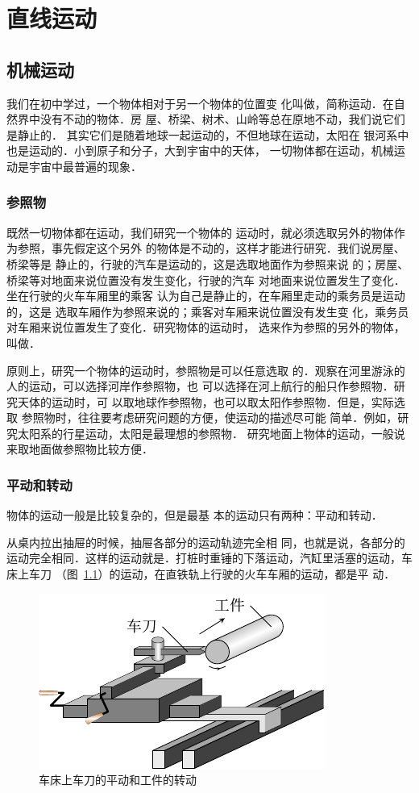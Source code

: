 \chapter{直线运动}\label{chapter-rectilinear-motion}

\section{机械运动}
 我们在初中学过，一个物体相对于另一个物体的位置变
化叫做，简称运动．在自然界中没有不动的物体．房
屋、桥梁、树术、山岭等总在原地不动，我们说它们是静止的．
其实它们是随着地球一起运动的，不但地球在运动，太阳在
银河系中也是运动的．小到原子和分子，大到宇宙中的天体，
一切物体都在运动，机械运动是宇宙中最普遍的现象．

\subsection{参照物} 

既然一切物体都在运动，我们研究一个物体的
运动时，就必须选取另外的物体作为参照，事先假定这个另外
的物体是不动的，这样才能进行研究．我们说房屋、桥梁等是
静止的，行驶的汽车是运动的，这是选取地面作为参照来说
的；房屋、桥梁等对地面来说位置没有发生变化，行驶的汽车
对地面来说位置发生了变化．坐在行驶的火车车厢里的乘客
认为自己是静止的，在车厢里走动的乘务员是运动的，这是
选取车厢作为参照来说的；乘客对车厢来说位置没有发生变
化，乘务员对车厢来说位置发生了变化．研究物体的运动时，
选来作为参照的另外的物体，叫做．

    原则上，研究一个物体的运动时，参照物是可以任意选取
的．观察在河里游泳的人的运动，可以选择河岸作参照物，也
可以选择在河上航行的船只作参照物．研究天体的运动时，可
以取地球作参照物，也可以取太阳作参照物．但是，实际选取
参照物时，往往要考虑研究问题的方便，使运动的描述尽可能
简单．例如，研究太阳系的行星运动，太阳是最理想的参照物．
研究地面上物体的运动，一般说来取地面做参照物比较方便．

\subsection{平动和转动} 
 物体的运动一般是比较复杂的，但是最基
本的运动只有两种：平动和转动．

    从桌内拉出抽屉的时候，抽屉各部分的运动轨迹完全相
同，也就是说，各部分的运动完全相同．这样的运动就是．打桩时重锤的下落运动，汽缸里活塞的运动，车床上车刀
（图~\ref{fig_A_2-1}）的运动，在直铁轨上行驶的火车车厢的运动，都是平
动．
\begin{figure}[htbp]
\centering
\includegraphics{fig/A/2-1.pdf}
\caption{车床上车刀的平动和工件的转动}\label{fig_A_2-1}
\end{figure}

